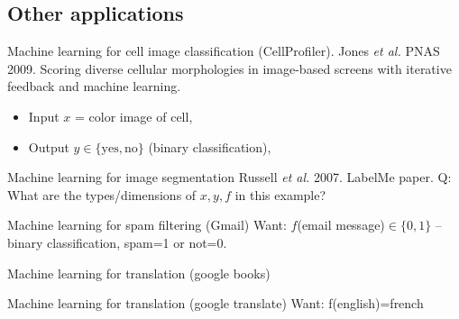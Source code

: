 \documentclass[12pt]{article}
\begin{document}


\subsection{Other applications}

Machine learning for cell image classification (CellProfiler).
Jones {\it et al.} PNAS 2009. Scoring diverse cellular morphologies in
image-based screens with iterative feedback and machine learning.
\begin{itemize}
  \item Input $x$ = color image of cell, 
  \item Output $y\in\{\text{yes}, \text{no}\}$ (binary classification),
\end{itemize}

{Machine learning for image segmentation}
Russell {\it et al.} 2007. LabelMe paper.
Q: What are the types/dimensions of $x,y,f$ in this example?

{Machine learning for spam filtering (Gmail)}
Want: $f$(email message)$\in\{0,1\}$ -- binary classification, spam=1
or not=0.

{Machine learning for translation (google books)}

{Machine learning for translation (google translate)}
Want: f(english)=french
\end{document}
